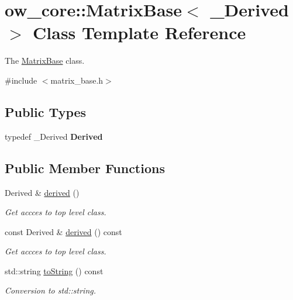 \hypertarget{classow__core_1_1MatrixBase}{}\section{ow\+\_\+core\+:\+:Matrix\+Base$<$ \+\_\+\+Derived $>$ Class Template Reference}
\label{classow__core_1_1MatrixBase}


The \hyperlink{classow__core_1_1MatrixBase}{Matrix\+Base} class.  




{\ttfamily \#include $<$matrix\+\_\+base.\+h$>$}

\subsection*{Public Types}
\begin{DoxyCompactItemize}
\item 
typedef \+\_\+\+Derived {\bfseries Derived}\hypertarget{classow__core_1_1MatrixBase_ac9a637d7d7c7334a614eb44e957d7ce5}{}\label{classow__core_1_1MatrixBase_ac9a637d7d7c7334a614eb44e957d7ce5}

\end{DoxyCompactItemize}
\subsection*{Public Member Functions}
\begin{DoxyCompactItemize}
\item 
Derived \& \hyperlink{classow__core_1_1MatrixBase_a91f9af4b866ecae399430459b3bd9b58}{derived} ()\hypertarget{classow__core_1_1MatrixBase_a91f9af4b866ecae399430459b3bd9b58}{}\label{classow__core_1_1MatrixBase_a91f9af4b866ecae399430459b3bd9b58}

\begin{DoxyCompactList}\small\item\em Get accces to top level class. \end{DoxyCompactList}\item 
const Derived \& \hyperlink{classow__core_1_1MatrixBase_a60983829f61073e35f90c608e46ed7c1}{derived} () const \hypertarget{classow__core_1_1MatrixBase_a60983829f61073e35f90c608e46ed7c1}{}\label{classow__core_1_1MatrixBase_a60983829f61073e35f90c608e46ed7c1}

\begin{DoxyCompactList}\small\item\em Get accces to top level class. \end{DoxyCompactList}\item 
std\+::string \hyperlink{classow__core_1_1MatrixBase_adb0b0436c648788ef6024c363c92637e}{to\+String} () const \hypertarget{classow__core_1_1MatrixBase_adb0b0436c648788ef6024c363c92637e}{}\label{classow__core_1_1MatrixBase_adb0b0436c648788ef6024c363c92637e}

\begin{DoxyCompactList}\small\item\em Conversion to std\+::string. \end{DoxyCompactList}\end{DoxyCompactItemize}


